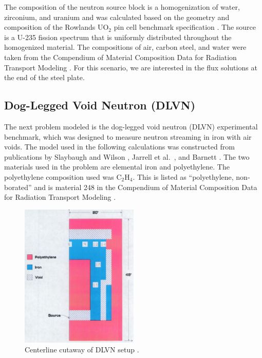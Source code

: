 \documentclass{article} %
\begin{document}
The composition of the neutron source block is a homogenization of water,
zirconium, and uranium and was calculated based on the geometry and
composition of the Rowlands UO$_2$ pin cell benchmark specification
\cite{pincell}. The source is a U-235 fission spectrum that is uniformly
distributed throughout the homogenized material. The compositions of air,
carbon steel, and water were taken from the Compendium of Material
Composition Data for Radiation Transport Modeling \cite{pnnl}. For this
scenario, we are interested in the flux solutions at the end of the steel plate.

\subsection{Dog-Legged Void Neutron (DLVN)}

The next problem modeled is the dog-legged void neutron (DLVN) experimental
benchmark, which was designed to measure neutron streaming in iron with air
voids. The model used in the following calculations was constructed from
publications by Slaybaugh and Wilson \cite{sw-dlvn}, Jarrell et al.\
\cite{j-dlvn}, and Barnett \cite{dlvn1991}. The two materials used in the
problem are elemental iron and polyethylene. The polyethylene composition used
was C$_2$H$_4$. This is listed as ``polyethylene, non-borated'' and is
material 248 in the Compendium of Material Composition Data for Radiation
Transport Modeling \cite{pnnl}.

\begin{figure}[!htb]
\centering
\includegraphics[width=0.5\textwidth]{dlvn.png}
\caption{Centerline cutaway of DLVN setup \cite{sw-dlvn}.}
\label{dlvn}
\end{figure}
\end{document}
